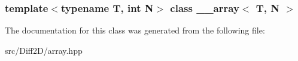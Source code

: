 \subsubsection*{template$<$typename T, int N$>$ class \_\-\_\-array$<$ T, N $>$}



The documentation for this class was generated from the following file:\begin{DoxyCompactItemize}
\item 
src/Diff2D/array.hpp\end{DoxyCompactItemize}
